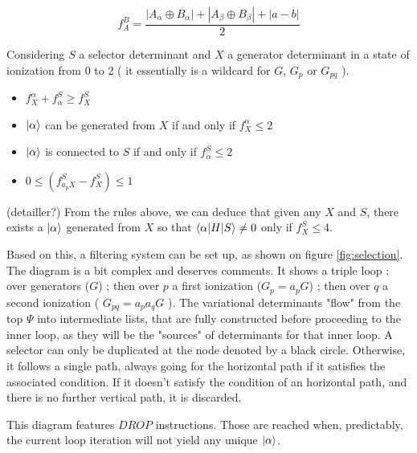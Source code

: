 $$f_A^B = \frac{|A_\alpha \oplus B_\alpha| + |A_\beta \oplus B_\beta| + |a-b|}{2}$$

Considering $S$ a selector determinant and $X$ a generator determinant in a state of ionization from 0 to 2 ( it essentially is a wildcard for $G$, $G_p$ or $G_{pq}$ ).

\begin{itemize}
\item
$f_X^\alpha + f_\alpha^S \geq f_X^S$
\item
$| \alpha \rangle$ can be generated from $X$ if and only if $f_X^\alpha \leq 2$
\item
$| \alpha \rangle$ is connected to $S$ if and only if $f_\alpha^S \leq 2$
\item
$0 \leq (f_{a_p X}^S - f_X^S) \leq 1$
\end{itemize}

(detailler?)
From the rules above, we can deduce that given any $X$ and $S$, there exists a $| \alpha \rangle$ generated from $X$ so that $\langle \alpha | H | S \rangle \neq 0$ only if $f_X^S \leq 4$.

Based on this, a filtering system can be set up, as shown on figure \ref{fig:selection}.\\

The diagram is a bit complex and deserves comments. 
It shows a triple loop : over generators ($G$) ; then over $p$ a first ionization ($G_p = a_p G$) ; then over $q$ a second ionization ( $G_{pq} = a_p a_q G$ ). The variational determinants "flow" from the top $\Psi$ into intermediate lists, that are fully constructed before proceeding to the inner loop, as they will be the "sources" of determinants for that inner loop.
A selector can only be duplicated at the node denoted by a black circle. Otherwise, it follows a single path, always going for the horizontal path if it satisfies the associated condition.
If it doesn't satisfy the condition of an horizontal path, and there is no further vertical path, it is discarded.

This diagram features $DROP$ instructions. Those are reached when, predictably, the current loop iteration will not yield any unique $| \alpha \rangle$. 

